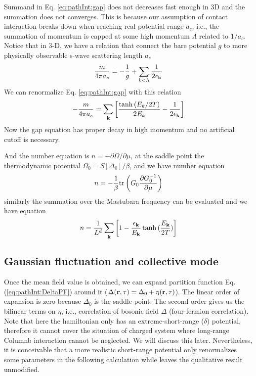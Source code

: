 Summand in Eq. \ref{eq:pathInt:gap} does not decreases fast enough in 3D and the summation does not converges.  This is because our assumption of contact interaction breaks down when reaching real potential range $a_{c}$, i.e., the summation of momentum is capped at some high momentum $\Lambda$ related to $1/a_{c}$.  Notice that in 3-D, we have a relation that connect the bare potential $g$ to more physically observable s-wave scattering length $a_{s}$
\begin{equation}
\frac{m}{4\pi{}a_{s}}=-\frac{1}{g}+\sum_{k<\Lambda}\frac{1}{2\epsilon_{\mathbf{k}}}
\end{equation}
We can renormalize Eq. \ref{eq:pathInt:gap} with this relation
\begin{equation}
-\frac{m}{4\pi{}a_{s}}=\sum_{\mathbf{k}}\left[\frac{\tanh{(E_k/2T)}}{2E_k}-\frac{1}{2\epsilon_{\mathbf{k}}}\right]
\end{equation}
Now the gap equation has proper decay in high momentum and no artificial cutoff is necessary.  

And the number equation is $n=-\partial\Omega/\partial\mu$, at the saddle point the thermodynamic potential $\Omega_{0}=S[\Delta_{0}]/\beta$, and we have number equation
\begin{equation*}
n=-\frac{1}{\beta}\text{tr}\left({G_{0}\frac{\partial{G_{0}^{-1}}}{\partial{\mu}}}\right)
\end{equation*}
similarly the summation over the Mastubara frequency can be evaluated and we have equation
\begin{equation}
n=\frac{1}{L^{d}}\sum_{\mathbf{k}}\left[1-\frac{\epsilon_{\mathbf{k}}}{E_{\mathbf{k}}}\tanh{(\frac{E_{\ensuremath{\mathbf{k}}}}{2T})}\right]
\end{equation}

\subsection{Gaussian fluctuation and collective mode}\label{sec:collective1}
Once the mean field value is obtained, we can expand partition function Eq. (\ref{eq:pathInt:DeltaPF}) around it ($\Delta(\mathbf{r},\tau)=\Delta_{0}+\eta(\mathbf{r},\tau)$). The linear order of  expansion is zero because $\Delta_{0}$ is the saddle point.  The second order gives us the bilinear terms on $\eta$, i.e., correlation of bosonic field $\Delta$ (four-fermion correlation).  Note that here the hamiltonian only has an extreme-short-range ($\delta$) potential, therefore it cannot cover the situation of charged system where long-range Columnb interaction cannot be neglected.  We will discuss this later.  Nevertheless, it is conceivable that a more realistic short-range potential only renormalizes some parameters in the following calculation while leaves the qualitative result unmodified.  

